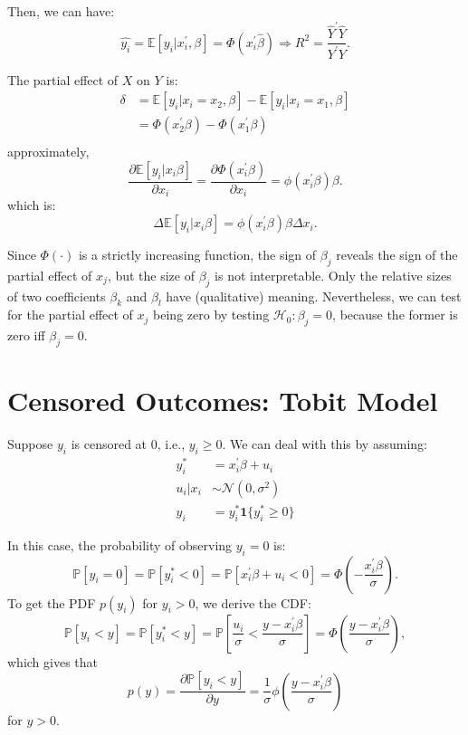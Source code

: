 Then, we can have:
\[ 
\hat{y_i} = \mathbb{E}[y_i|x_i^{\prime}, \beta ] = \Phi(x_i^{\prime} \hat{\beta}) \Rightarrow R^2 = \frac{\hat{Y}^{\prime} \hat{Y}}{Y^{\prime} Y}.
\]

The partial effect of $X$ on $Y$ is:
\begin{align*}
    \delta &= \mathbb{E}[y_i|x_i=x_2, \beta] - \mathbb{E}[y_i|x_i=x_1, \beta] \\
    &= \Phi(x_2^{\prime} \beta ) - \Phi(x_1^{\prime} \beta )\\
\end{align*}
approximately,
\[
\frac{\partial \mathbb{E}[y_i|x_i \beta]}{\partial x_i} = \frac{\partial \Phi(x_i^{\prime} \beta)}{\partial x_i} = \phi(x_i^{\prime} \beta) \beta.
\]
which is: 
\[
\Delta \mathbb{E}[y_i|x_i \beta] = \phi(x_i^{\prime} \beta ) \beta \Delta x_i.
\]

Since $\Phi(\cdot)$ is a strictly increasing function, 
the sign of $\beta_j$ reveals the sign of the partial effect of $x_{j}$,
but the size of $\beta_{j}$ is not interpretable. 
Only the relative sizes of two coefficients $\beta_k$ and $\beta_{l}$ 
have (qualitative) meaning. Nevertheless, 
we can test for the partial effect of $x_j$ being zero 
by testing $\mathcal{H}_0:\beta_j=0$, 
because the former is zero iff $\beta_j=0.$

\section{Censored Outcomes: Tobit Model}

Suppose $y_i$ is censored at 0, i.e., $y_i \geq 0$.
We can deal with this by assuming:
\begin{align*}
    y_i^* &= x_i^{\prime} \beta + u_i\\
    u_i|x_i &\sim \mathcal{N}(0, \sigma^2)\\
    y_i &= y_i^* \mathbf{1}\{y_i^* \geq 0\}
\end{align*}

In this case, the probability of observing $y_i=0$ is:
\[
\mathbb{P}[y_i=0] = \mathbb{P}[y_i^* < 0] = \mathbb{P}[x_i^{\prime} \beta + u_i < 0] = \Phi\left(-\frac{x_i^{\prime} \beta}{\sigma}\right).
\]
To get the PDF $p(y_i)$ for $y_{i}>0$, we derive the CDF:
\[ 
\mathbb{P}[y_i < y] = \mathbb{P}[y_i^* < y] = \mathbb{P}\left[\frac{u_i}{\sigma} < \frac{y-x_i^{\prime} \beta}{\sigma}\right] = \Phi\left(\frac{y - x_i^{\prime} \beta}{\sigma}\right),
\]
which gives that
\[
p(y) = \frac{\partial \mathbb{P}[y_i < y]}{\partial y} = \frac{1}{\sigma} \phi\left(\frac{y - x_i^{\prime} \beta}{\sigma}\right)
\]
for $y>0$.

